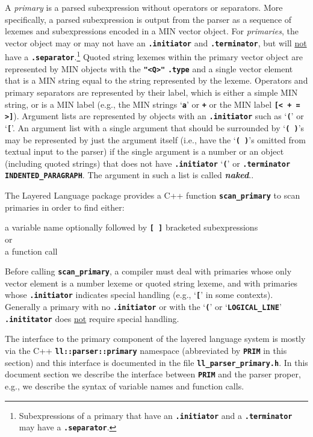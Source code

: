 \documentclass[12pt]{article}
\newcommand{\TT}[1]{{\tt \bfseries #1}}
\newcommand{\key}[1]{{\bf \em #1}\index{#1}}
\begin{document}
A {\em primary} is a parsed subexpression without operators or
separators.  More specifically,
a parsed subexpression is output from the parser as
a sequence of lexemes and subexpressions encoded
in a MIN vector object.  For {\em primaries}, the
vector object may or may not have
an \TT{.initiator} and \TT{.terminator}, but will
\underline{not} have a \TT{.separator}.\footnote{
Subexpressions of a primary that have an \TT{.initiator} and a \TT{.terminator}
may have a \TT{.separator}.}
Quoted string lexemes
within the primary vector object are represented by MIN objects with the
\TT{"<Q>"} \TT{.type} and a single vector element that is a MIN string
equal to the string represented by the lexeme.  Operators and
primary separators are
represented by their label, which is either a simple MIN string,
or is a MIN label (e.g., the MIN strings `\TT{a}' or \TT{+}
or the MIN label \TT{[< + = >]}).  Argument lists are represented
by objects with an \TT{.initiator} such as `\TT{(}' or `\TT{[}'.
An argument list with a single argument that should be surrounded
by `\TT{(~)}'s may be represented by just the argument itself
(i.e., have the `\TT{(~)}'s omitted from textual input to the parser)
if the single argument
is a number or an object (including quoted strings) that does not have
\TT{.initiator} `\TT{(}' or \TT{.terminator} \TT{INDENTED\_PARAGRAPH}.
The argument
in such a list is called \key{naked}.\label{NAKED-ARGUMENT}.

The Layered Language package provides a C++ function \TT{scan\_primary}
to scan primaries in order to find either:
\begin{center}
a variable name optionally followed by \TT{[~]} bracketed subexpressions \\
or \\
a function call
\end{center}
Before calling \TT{scan\_primary}, a compiler must deal with primaries
whose only vector element is a number lexeme or quoted string lexeme,
and with primaries whose \TT{.initiator} indicates special handling
(e.g., `\TT{[}' in some contexts).
Generally a primary with no \TT{.initiator} or with the `\TT{(}' or
`\TT{LOGICAL\_LINE}' \TT{.inititator} does \underline{not} require
special handling.

The interface to the primary component of the layered language system 
is mostly via the C++ \TT{ll::parser::primary} namespace (abbreviated
by \TT{PRIM} in this section)
and this interface is documented in the file
\TT{ll\_parser\_primary.h}. 
In this document section we describe the interface between \TT{PRIM}
and the parser proper, e.g., we describe the syntax of variable
names and function calls.
\end{document}

